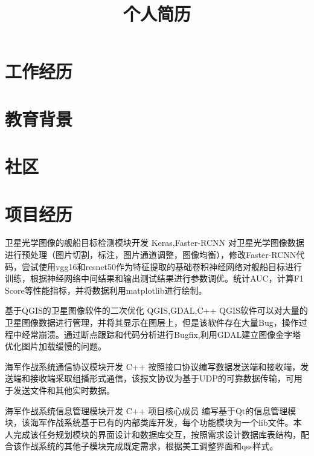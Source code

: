 \documentclass[11pt,a4paper]{moderncv}
\title{个人简历}                      %
\begin{document}
\maketitle

\section{工作经历}

\section{教育背景}


\section{社区}

\section{项目经历}
\renewcommand{\baselinestretch}{1.2}
{卫星光学图像的舰船目标检测模块开发}
{Keras,Faster-RCNN}
{}{}
{对卫星光学图像数据进行预处理（图片切割，标注，图片通道调整，图像均衡），修改Faster-RCNN代码，尝试使用vgg16和resnet50作为特征提取的基础卷积神经网络对舰船目标进行训练，根据神经网络中间结果和输出测试结果进行参数调优。统计AUC，计算F1 Score等性能指标，并将数据利用matplotlib进行绘制。}

{基于QGIS的卫星图像软件的二次优化}
{QGIS,GDAL,C++}
{}{}
{QGIS软件可以对大量的卫星图像数据进行管理，并将其显示在图层上，但是该软件存在大量Bug，操作过程中经常崩溃。通过断点跟踪和代码分析进行Bugfix,利用GDAL建立图像金字塔优化图片加载缓慢的问题。}

{海军作战系统通信协议模块开发}
{C++}
{}{}
{按照接口协议编写数据发送端和接收端，发送端和接收端采取组播形式通信，该报文协议为基于UDP的可靠数据传输，可用于发送文件和其他实时数据。}

{海军作战系统信息管理模块开发}
{C++}
{}{项目核心成员}
{编写基于Qt的信息管理模块，该海军作战系统基于已有的内部类库开发，每个功能模块为一个lib文件。本人完成该任务规划模块的界面设计和数据库交互，按照需求设计数据库表结构，配合该作战系统的其他子模块完成既定需求，根据美工调整界面和qss样式。}
\end{document}
